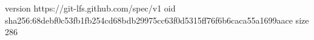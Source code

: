 version https://git-lfs.github.com/spec/v1
oid sha256:68debf0c53fb1fb254cd68bdb29975cc63f0d5315ff76f6b6caca55a1699aace
size 286
